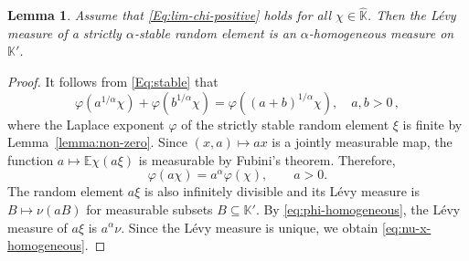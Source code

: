 \documentclass[12pt]{amsart}
\numberwithin{equation}{section}
\numberwithin{figure}{section}
\theoremstyle{plain} \newtheorem{theorem}{Theorem}[section]
\theoremstyle{plain} \newtheorem{proposition}[theorem]{Proposition}
\theoremstyle{plain} \newtheorem{lemma}[theorem]{Lemma}
\theoremstyle{plain} \newtheorem{corollary}[theorem]{Corollary}
\theoremstyle{definition} \newtheorem{definition}[theorem]{Definition}
\theoremstyle{definition} \newtheorem{notation}[theorem]{Notation}
\theoremstyle{remark} \newtheorem{remark}[theorem]{Remark}
\theoremstyle{remark} \newtheorem{example}[theorem]{Example}
\theoremstyle{definition} \newtheorem{assumption}{Assumption}
\newcommand{\bE}{\mathbb{E}}
\newcommand{\bK}{\mathbb{K}}
\newcommand{\bKH}{\hat{\bK}}
\renewcommand{\phi}{\varphi}
\begin{document}
\begin{lemma}
  \label{lemma:homogeneous}
  Assume that \eqref{Eq:lim-chi-positive} holds for all $\chi\in\bKH$.
  Then the L\'evy measure of a strictly $\alpha$-stable random
  element is an $\alpha$-homogeneous measure on $\bK'$.
\end{lemma}
\begin{proof}
  It follows from \eqref{Eq:stable} that 
  \begin{displaymath}
    \phi(a^{1/\alpha}\chi)+\phi(b^{1/\alpha}\chi)
    =\phi((a+b)^{1/\alpha}\chi),\quad a,b>0\,,
  \end{displaymath}
  where the Laplace exponent $\phi$ of the strictly stable random
  element $\xi$ is finite by Lemma~\ref{lemma:non-zero}.  Since
  $(x,a)\mapsto ax$ is a jointly measurable map, the function $a
  \mapsto \bE\chi(a\xi)$ is measurable by Fubini's theorem. Therefore,
  \begin{equation}
    \label{eq:phi-homogeneous}
    \phi(a\chi)=a^\alpha\phi(\chi),\qquad a>0.
  \end{equation}
  The random element $a\xi$ is also infinitely divisible and its
  L\'evy measure is $B \mapsto \nu(aB)$ for measurable subsets $B\subseteq\bK'$. By
  \eqref{eq:phi-homogeneous}, the L\'evy measure of $a\xi$ is
  $a^\alpha\nu$. Since the L\'evy measure is unique, we obtain
  \eqref{eq:nu-x-homogeneous}.
\end{proof}
\end{document}
